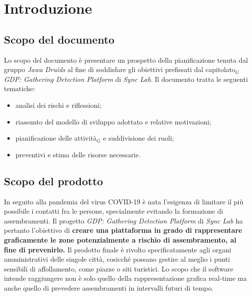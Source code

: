 \chapter{Introduzione}\label{Introduzione}

\section{Scopo del documento}\label{IntorduzioneScopoDelDocumento}
Lo scopo del documento è presentare un prospetto della pianificazione tenuta dal gruppo \textit{Jawa Druids} al fine di soddisfare gli obiettivi prefissati dal capitolato$_G$ \textit{GDP: Gathering Detection Platform} di \textit{Sync Lab}. Il documento tratta le seguenti tematiche:
\begin{itemize}
\item analisi dei rischi e riflessioni;
\item riassunto del modello di sviluppo adottato e relative motivazioni;
\item pianificazione delle attività$_G$ e suddivisione dei ruoli;
\item preventivi e stima delle risorse necessarie.
\end{itemize}

\section{Scopo del prodotto}\label{IntroduzioneScopoDelProdotto}
In seguito alla pandemia del virus COVID-19 è nata l'esigenza di limitare il più possibile i contatti fra le persone, specialmente evitando la formazione di assembramenti. Il progetto \textit{GDP: Gathering Detection Platform} di \textit{Sync Lab} ha pertanto l'obiettivo di \textbf{creare una piattaforma in grado di rappresentare graficamente le zone potenzialmente a rischio di assembramento, al fine di prevenirlo.}
Il prodotto finale è rivolto specificatamente agli organi amministrativi delle singole città, cosicché possano gestire al meglio i punti sensibili di affollamento, come piazze o siti turistici.
Lo scopo che il software intende raggiungere non è solo quello della rappresentazione grafica real-time ma anche quello di prevedere assembramenti in intervalli futuri di tempo.

